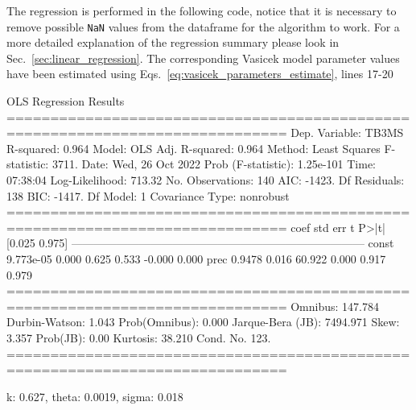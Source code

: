 The regression is performed in the following code, notice that it is necessary to remove possible \texttt{NaN} values from the dataframe for the algorithm to work. For a more detailed explanation of the regression summary please look in Sec.~\ref{sec:linear_regression}.
The corresponding Vasicek model parameter values have been estimated using Eqs.~\ref{eq:vasicek_parameters_estimate}, lines 17-20


\begin{ioutput}
                            OLS Regression Results                            
==============================================================================
Dep. Variable:                  TB3MS   R-squared:                       0.964
Model:                            OLS   Adj. R-squared:                  0.964
Method:                 Least Squares   F-statistic:                     3711.
Date:                Wed, 26 Oct 2022   Prob (F-statistic):          1.25e-101
Time:                        07:38:04   Log-Likelihood:                 713.32
No. Observations:                 140   AIC:                            -1423.
Df Residuals:                     138   BIC:                            -1417.
Df Model:                           1                                         
Covariance Type:            nonrobust                                         
==============================================================================
                 coef    std err          t      P>|t|      [0.025      0.975]
------------------------------------------------------------------------------
const       9.773e-05      0.000      0.625      0.533      -0.000       0.000
prec           0.9478      0.016     60.922      0.000       0.917       0.979
==============================================================================
Omnibus:                      147.784   Durbin-Watson:                   1.043
Prob(Omnibus):                  0.000   Jarque-Bera (JB):             7494.971
Skew:                           3.357   Prob(JB):                         0.00
Kurtosis:                      38.210   Cond. No.                         123.
==============================================================================

k: 0.627, theta: 0.0019, sigma: 0.018
\end{ioutput}

